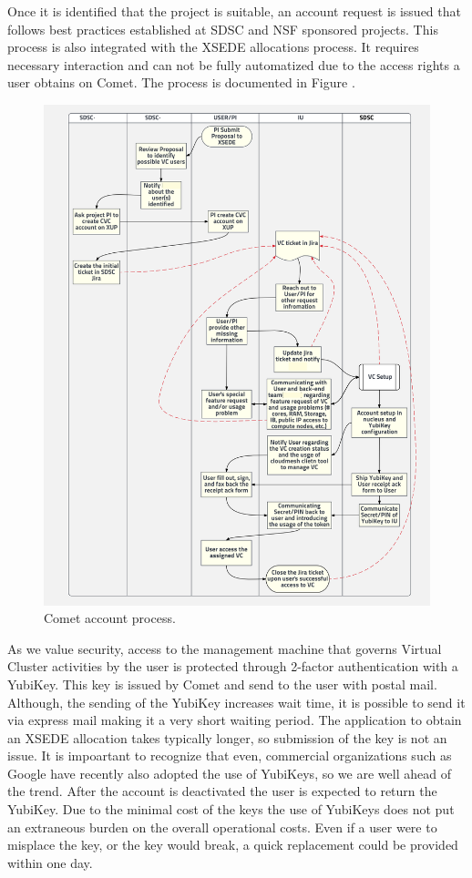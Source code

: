 \documentclass[sigconf,hyphens]{acmart}
\begin{document}
Once it is identified that the project is suitable, an account request
is issued that follows best practices established at SDSC and NSF
sponsored projects. This process is also integrated with the XSEDE
allocations process. It requires necessary interaction and can not be
fully automatized due to the access rights a user obtains on Comet.
The process is documented in Figure \label{fig:account}.

\begin{figure}[h]
  \centering
  \includegraphics[width=\linewidth]{images/commet-account-creation.png}
  \caption{Comet account process.}\label{fig:account}
\end{figure}

As we value security, access to the management machine that governs
Virtual Cluster activities by the user is protected through 2-factor
authentication with a YubiKey. This key is issued by Comet and send to
the user with postal mail. Although, the sending of the YubiKey
increases wait time, it is possible to send it via express mail making
it a very short waiting period. The application to obtain an XSEDE
allocation takes typically longer, so submission of the key is not an
issue. It is impoartant to recognize that even, commercial
organizations such as Google have recently also adopted the use of
YubiKeys, so we are well ahead of the trend. After the account is
deactivated the user is expected to return the YubiKey. Due to the
minimal cost of the keys the use of YubiKeys does not put an
extraneous burden on the overall operational costs. Even if a user
were to misplace the key, or the key would break, a quick replacement
could be provided within one day.
\end{document}
